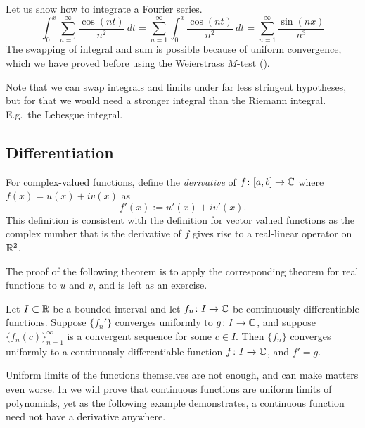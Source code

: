 \begin{example}
Let us show how to integrate a Fourier series.
\begin{equation*}
\int_{0}^x \sum_{n=1}^\infty \frac{\cos(nt)}{n^2} ~dt
=
\sum_{n=1}^\infty \int_{0}^x \frac{\cos(nt)}{n^2}~dt
=
\sum_{n=1}^\infty \frac{\sin(nx)}{n^3}
\end{equation*}
The swapping of integral and sum is possible because of uniform convergence,
which we have proved before using the Weierstrass $M$-test
().
\end{example}

Note that we can swap integrals and limits under far less stringent hypotheses,
but for that we would need a stronger integral than the Riemann integral.
E.g.\ the Lebesgue integral.

\subsection{Differentiation}

For complex-valued functions, define the
\emph{derivative}
of $f \colon [a,b] \to
{\mathbb{C}}$ where $f(x) = u(x)+iv(x)$ as
\begin{equation*}
f'(x) := u'(x)+iv'(x) .
\end{equation*}
This definition is consistent with the definition for vector valued
functions as the complex number that is the derivative of $f$ gives rise to
a real-linear operator on ${\mathbb{R}}^2$.

The proof of the following theorem is to apply the corresponding theorem for
real functions to $u$ and $v$, and is left as an exercise.

\begin{thm} \label{thm:dersconvergecomplex}
Let $I \subset {\mathbb{R}}$ be a bounded interval and let
$f_n \colon I \to {\mathbb{C}}$ be continuously differentiable functions.
Suppose $\{ f_n' \}$ converges uniformly to $g \colon I \to {\mathbb{C}}$,
and suppose $\{ f_n(c) \}_{n=1}^\infty$ is a
convergent sequence for some $c \in I$.  Then $\{ f_n \}$ converges uniformly to 
a continuously differentiable function $f \colon I \to {\mathbb{C}}$, and $f' = g$.
\end{thm}

Uniform limits of the functions themselves are not enough, and can make
matters even worse.  In  we will prove that
continuous functions are uniform limits of polynomials, yet as the following
example demonstrates, a continuous function need not have a derivative
anywhere.

